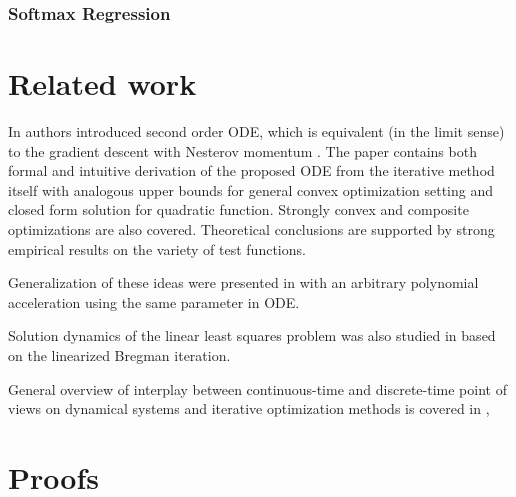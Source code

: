 \documentclass{article}
\begin{document}
\subsubsection{Softmax Regression}


\section{Related work}

In \cite{su2014differential} authors introduced second order ODE, which is equivalent (in the limit sense) to the gradient descent with Nesterov momentum \cite{nesterov1983method}. The paper contains both formal and intuitive derivation of the proposed ODE from the iterative method itself with analogous upper bounds for general convex optimization setting and closed form solution for quadratic function. Strongly convex and composite optimizations are also covered. Theoretical conclusions are supported by strong empirical results on the variety of test functions.

Generalization of these ideas were presented in \cite{wibisono2016variational} with an arbitrary polynomial acceleration using the same parameter in ODE.

Solution dynamics of the linear least squares problem was also studied in \cite{osher2016sparse} based on the linearized Bregman iteration.

General overview of interplay between continuous-time and discrete-time point of views on dynamical systems and iterative optimization methods is covered in \cite{helmke2012optimization}, \cite{evtushenko1994stable}

\newpage






\appendix
\section{Proofs}
\end{document}
